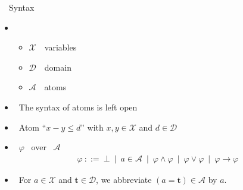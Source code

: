 \newcommand{\Variables}{\ensuremath{\mathcal{X}}}
\newcommand{\Domain}{\ensuremath{\mathcal{D}}}
\newcommand{\Atoms}{\ensuremath{\mathcal{A}}}
\newcommand{\ThAt}{\mathit{a}}
\newcommand{\Undefined}{\ensuremath{\boldsymbol{u}}}
\newcommand{\val}{v}
\newcommand{\den}[1]{\llbracket \, #1 \, \rrbracket}
%
\begin{frame}{\HTC\ \ Syntax}
  \begin{itemize}
  \item {} \ \tuple{\Variables,\Domain,\Atoms}
    \begin{itemize}
    \item \Variables\ \ variables
    \item \Domain\    \ domain
    \item \Atoms\     \ atoms
    \end{itemize}
    \smallskip
  \item<2->  \ The syntax of atoms is left open
  \item<2->  \ Atom ``$x - y \leq d$'' with $x, y \in \Variables$ and $d \in \Domain$
    \medskip
  \item<3->  \ $\varphi$ \ over \ \Atoms\
    \begin{align*}
      \varphi \ ::= \ \bot \ \mid \ \ThAt\in\Atoms\ \mid \ \varphi \land \varphi \ \mid \  \varphi \lor \varphi \ \mid \  \varphi \rightarrow \varphi
    \end{align*}
  \item <4->  \
    For $a\in\Variables$ and $\boldsymbol{t}\in\Domain$,
    we abbreviate $(a=\boldsymbol{t})\in\Atoms$ by $a$.
  \end{itemize}
\end{frame}
